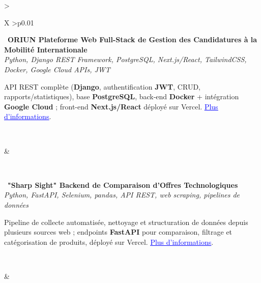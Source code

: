 \documentclass[letterpaper,10pt]{article}
\newcommand{\indentbox}[2][1em]{\hspace*{#1}\parbox{\dimexpr\linewidth-#1\relax}{#2}}
\begin{document}
  \begin{tabularx}{\textwidth}{>{\raggedright\arraybackslash}X >{\raggedleft\arraybackslash}p{0.01\textwidth}}

    \begin{minipage}[t]{\linewidth}\raggedright
      \textbullet\ \textbf{ORIUN \textendash{} Plateforme Web Full-Stack de Gestion des Candidatures \`a la Mobilit\'e Internationale}\\
      \textit{\footnotesize Python, Django REST Framework, PostgreSQL, Next.js/React, TailwindCSS, Docker, Google Cloud APIs, JWT}\\
      \indentbox{\footnotesize API REST compl\`ete (\textbf{Django}, authentification \textbf{JWT}, CRUD, rapports/statistiques), base \textbf{PostgreSQL}, back-end \textbf{Docker} + int\'egration \textbf{Google Cloud} ; front-end \textbf{Next.js/React} d\'eploy\'e sur Vercel. \href{https://github.com/JavierTarazona06/ORIUN_back}{\textcolor{blue}{\underline{Plus d'informations}}}.}\\
    \end{minipage}
    &
    \begin{minipage}[t]{\linewidth}\raggedleft %
    \end{minipage}\\

    \begin{minipage}[t]{\linewidth}\raggedright
      \textbullet\ \textbf{"Sharp Sight" \textendash{} Backend de Comparaison d'Offres Technologiques}\\
      \textit{\footnotesize Python, FastAPI, Selenium, pandas, API REST, web scraping, pipelines de donn\'ees}\\
      \indentbox{\footnotesize Pipeline de collecte automatis\'ee, nettoyage et structuration de donn\'ees depuis plusieurs sources web ; endpoints \textbf{FastAPI} pour comparaison, filtrage et cat\'egorisation de produits, d\'eploy\'e sur Vercel. \href{https://github.com/JavierTarazona06/SharpSight}{\textcolor{blue}{\underline{Plus d'informations}}}.}\\
    \end{minipage}
    &
    \begin{minipage}[t]{\linewidth}\raggedleft %
    \end{minipage}\\


\end{tabularx}
\end{document}
